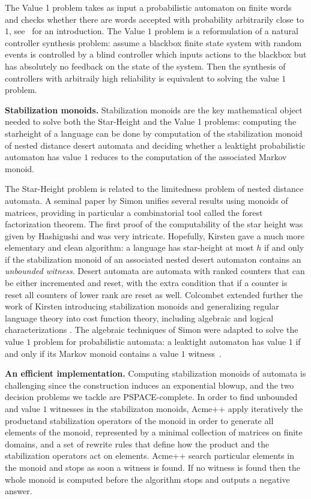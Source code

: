 The Value 1 problem takes as input a probabilistic automaton on finite words and checks whether there are words accepted with probability arbitrarily close to $1$, see~\cite{FGO12} for an introduction.
The Value $1$ problem is a reformulation of a natural controller synthesis problem:
assume a blackbox finite state system with random events
is controlled by a blind controller which inputs actions to the blackbox
but has absolutely no feedback on the state of the system.
Then the synthesis of controllers with arbitraily high reliability is equivalent to solving the value $1$ problem.



\textbf{ Stabilization monoids.} Stabilization monoids are the key mathematical object needed to solve both the Star-Height and the Value 1 problems:
computing the starheight of a language can be done by computation of the stabilization monoid of
nested distance desert automata and deciding whether a leaktight probabilistic automaton has value $1$
reduces to the computation of the associated Markov monoid.

The Star-Height problem is related to the limitedness problem of nested distance automata.
A seminal paper by Simon \cite{Sim94} unifies several results using monoids of matrices, providing in particular a combinatorial tool called the forest factorization theorem. 
The first proof of the computability of the star height was given by Hashigushi and was very intricate.
Hopefully, Kirsten gave a much more elementary and clean algorithm:
a language has star-height at most $h$ if and only if the stabilization monoid of an associated nested desert automaton contains an \emph{unbounded witness}.
Desert automata are automata with ranked counters that can be either incremented and reset,
with the extra condition that if a counter is reset all counters of lower rank are reset as well.
Colcombet extended further the work of Kirsten introducing stabilization monoids and generalizing regular language theory into cost function theory, including algebraic and logical characterizations \cite{Colcombet09,CKL10,Kup14}. 
The algebraic techniques of Simon were adapted to solve the value $1$ problem for probabilistic automata:
a leaktight automaton has value $1$ if and only if its Markov monoid
contains a value $1$ witness~\cite{FGO12}.

\textbf{An efficient implementation.} Computing stabilization monoids of automata is challenging since the construction induces an exponential blowup, and the two decision problems we tackle are PSPACE-complete. In order to find unbounded and value $1$ witnesses in the stabilizaton monoids, Acme++
%
apply iteratively the productand stabilization operators of the monoid in order to generate all elements of the monoid, represented by a minimal collection of matrices on finite domains, and a set of rewrite rules that define how the product and the stabilization operators act on elements.
Acme++ search particular elements in the monoid and stops as soon a witness is found. If no witness is found then the whole monoid is computed before the algorithm stops and outputs a negative answer.

